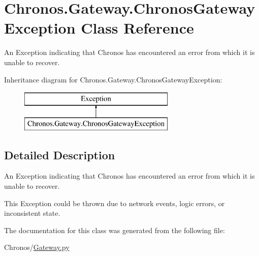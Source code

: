 \hypertarget{classChronos_1_1Gateway_1_1ChronosGatewayException}{}\section{Chronos.\+Gateway.\+Chronos\+Gateway\+Exception Class Reference}
\label{classChronos_1_1Gateway_1_1ChronosGatewayException}


An Exception indicating that Chronos has encountered an error from which it is unable to recover.  


Inheritance diagram for Chronos.\+Gateway.\+Chronos\+Gateway\+Exception\+:\begin{figure}[H]
\begin{center}
\leavevmode
\includegraphics[height=2.000000cm]{classChronos_1_1Gateway_1_1ChronosGatewayException}
\end{center}
\end{figure}


\subsection{Detailed Description}
An Exception indicating that Chronos has encountered an error from which it is unable to recover. 

This Exception could be thrown due to network events, logic errors, or inconsistent state. 

The documentation for this class was generated from the following file\+:\begin{DoxyCompactItemize}
\item 
Chronos/\hyperlink{Gateway_8py}{Gateway.\+py}\end{DoxyCompactItemize}
